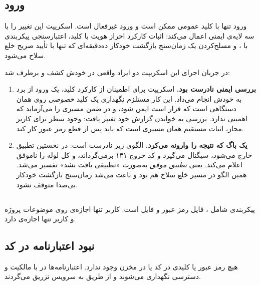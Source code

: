 \subsection{ورود }

ورود تنها با کلید عمومی ممکن است و ورود  غیرفعال است. اسکریپت  این تغییر را با سه لایه‌ی ایمنی اعمال می‌کند: اثبات کارکرد احراز هویت با کلید، اعتبارسنجی پیکربندی با ، و مسلح‌کردن یک زمان‌سنج بازگشت خودکار ده‌دقیقه‌ای که تنها با تأیید صریح خلع سلاح می‌شود.

در جریان اجرای این اسکریپت دو ایراد واقعی در خودش کشف و برطرف شد:

\begin{enumerate}
	\item \textbf{بررسی ایمنی نادرست بود.} اسکریپت برای اطمینان از کارکرد کلید، یک ورود  از برد به خودش انجام می‌داد. این کار مستلزم نگهداری یک کلید \emph{خصوصی} روی همان دستگاهی است که قرار است ایمن شود، و در ضمن مسیری را می‌آزماید که اهمیتی ندارد. بررسی به خواندن گزارش خود  تغییر یافت: وجود سطر  برای کاربر مجاز، اثبات مستقیم همان مسیری است که باید پس از قطع رمز عبور کار کند.

	\item \textbf{یک باگ  که نتیجه را وارونه می‌کرد.} الگوی  زیر  نادرست است:  در نخستین تطبیق خارج می‌شود،  سیگنال  می‌گیرد و کد خروج ۱۴۱ برمی‌گرداند، و  کل لوله را ناموفق اعلام می‌کند. یعنی \emph{تطبیق موفق} به‌صورت «تطبیقی یافت نشد» تفسیر می‌شد. همین الگو در مسیر خلع سلاح هم بود و باعث می‌شد زمان‌سنج بازگشت خودکار بی‌صدا متوقف نشود.
\end{enumerate}

\subsection{}

پیکربندی  شامل ، فایل رمز عبور و فایل  است. کاربر  تنها اجازه‌ی  روی موضوعات پروژه و کاربر  تنها اجازه‌ی  دارد.

\subsection{نبود اعتبارنامه در کد}

هیچ رمز عبور یا کلیدی در کد یا در مخزن وجود ندارد. اعتبارنامه‌ها در  با مالکیت  و دسترسی  نگهداری می‌شوند و از طریق  به سرویس تزریق می‌گردند.

